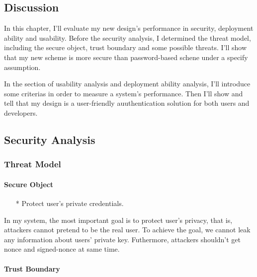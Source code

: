 \begin{CJK}{Bg5}{bsmi}


\chapter{Discussion}

In this chapter, I'll evaluate my new design's performance in security, deployment ability and usability. Before the security analysis, I determined the threat model\cite{threat-model}, including the secure object, trust boundary and some possible threats. I'll show that my new scheme is more secure than password-based schene under a specify assumption.

In the section of usability analysis and deployment ability analysis, I'll introduce some criterias in order to measure a system's performance. Then I'll show and tell that my design is a user-friendly auuthentication solution for both users and developers.

\section{Security Analysis}

\subsection{Threat Model}

\subsubsection{Secure Object}

\begin{enumerate}
\item[*] Protect user's private credentials.
\end{enumerate}

In my system, the most important goal is to protect user's privacy, that is, attackers cannot pretend to be the real user. To achieve the goal, we cannot leak any information about users' private key. Futhermore, attackers shouldn't get nonce and signed-nonce at same time.

\subsubsection{Trust Boundary}


\end{CJK}
